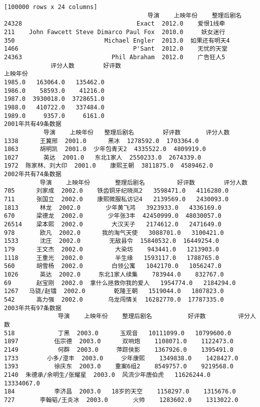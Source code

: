 \documentclass[11pt]{article}
\begin{document}
\begin{Verbatim}[commandchars=\\\{\}]
[100000 rows x 24 columns]
                                        导演    上映年份    整理后剧名
24328                                Exact  2012.0    爱恨1线牵
211    John Fawcett Steve Dimarco Paul Fox  2010.0     妖女迷行
350                         Michael Engler  2013.0  如果还有明天4
1466                                P'Sant  2012.0    无忧的天堂
24363                         Phil Abraham  2012.0    广告狂人5
             评分人数        好评数
上映年份                        
1985.0   163064.0   135462.0
1986.0    58593.0    41216.0
1987.0  3930018.0  3728651.0
1988.0   410722.0   337484.0
1989.0     9357.0     6161.0
2001年共有49条数据
           导演    上映年份   整理后剧名        好评数       评分人数
1338      王冀邢  2001.0      黑冰  1278592.0  1703364.0
1863      胡明凯  2001.0  少年包青天2  4335522.0  4809919.0
1027       英达  2001.0   东北1家人  2550233.0  2674339.0
1972  陈家林、刘大印  2001.0    康熙王朝  3811875.0  4589462.0
2002年共有74条数据
          导演    上映年份       整理后剧名         好评数        评分人数
705      刘家成  2002.0    铁齿铜牙纪晓岚2   3598471.0   4116280.0
711      张国立  2002.0    康熙微服私访记4   2139569.0   2430093.0
1813      林龙  2002.0       少年黄飞鸿   3923933.0   4336169.0
670      梁德龙  2002.0       少年张3丰  42450999.0  48030057.0
26514    梁本熙  2002.0        大汉天子   2174612.0   2471649.0
978       欧凡  2002.0      我的淘气天使   3088701.0   3100421.0
1533      沈庄  2002.0        无敌县令  15840532.0  16449254.0
179      王文杰  2002.0         大染坊    943441.0   1213903.0
1118     王重光  2002.0         半生缘   1593117.0   1788765.0
560      胡雪杨  2002.0        白领公寓   1042170.0   1056247.0
1026      英达  2002.0     东北1家人续集    783944.0    832767.0
69       赵宝刚  2002.0  拿什么拯救你我的爱人   1954774.0   2184294.0
1267   马骁/赵镭  2002.0        乾隆王朝   1519044.0   1807823.0
542      高力强  2002.0       乌龙闯情关  16282770.0  17787335.0
2003年共有97条数据
               导演    上映年份    整理后剧名          好评数         评分人数
518            丁黑  2003.0      玉观音   10111099.0   10799600.0
1897          伍宗德  2003.0      双响炮    1108071.0    1122473.0
2149           何群  2003.0     萍踪侠影    1367926.0    1395491.0
1733        小多/澄丰  2003.0     少年康熙    1349838.0    1428427.0
1393          徐庆东  2003.0    重案6组2    8549757.0    9219568.0
2140  朱德承/余明生/张耀星  2003.0  风流少年唐伯虎   11626244.0   13334067.0
184           李济昌  2003.0   18岁的天空    1158297.0    1315676.0
727       李翰韬/王炎冰  2003.0       火帅    1283602.0    1313022.0

\end{Verbatim}
\end{document}
